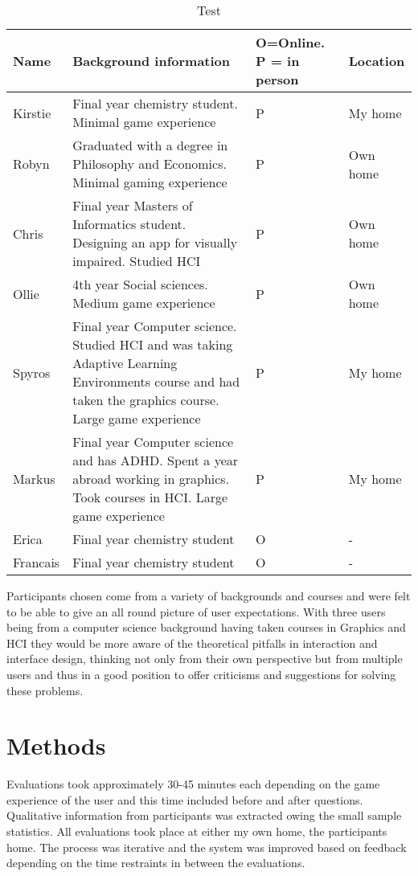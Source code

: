 \begin{table}[H]
    \begin{tabular}{| p{2cm} | p{9cm} | p{3cm} | p{3cm} |}
    \hline
    Name & Background information & O=Online. P = in person & Location \\
    \hline
    \hline
    Kirstie & Final year chemistry student. Minimal game experience & P & My home\\ \hline
    Robyn & Graduated with a degree in Philosophy and Economics. Minimal gaming experience & P & Own home \\ \hline
    Chris & Final year Masters of Informatics student. Designing an app for visually impaired. Studied HCI & P & Own home \\ \hline
    Ollie & 4th year Social sciences. Medium game experience & P & Own home \\ \hline
    Spyros & Final year Computer science. Studied HCI and was taking Adaptive Learning Environments course and had taken the graphics course. Large game experience & P & My home \\ \hline
    Markus & Final year Computer science and has ADHD. Spent a year abroad working in graphics. Took courses in HCI. Large game experience & P & My home \\ \hline
    Erica & Final year chemistry student & O & -\\ \hline
    Francais & Final year chemistry student & O & - \\ \hline
    \end{tabular}
    \caption{Test}
\end{table}

Participants chosen come from a variety of backgrounds and courses and were felt to be able to give an all round picture of user expectations. With three users being from a computer science background having taken courses in Graphics and HCI they would be more aware of the theoretical pitfalls in interaction and interface design, thinking not only from their own perspective but from multiple users and thus in a good position to offer criticisms and suggestions for solving these problems.

\section{Methods}

Evaluations took approximately 30-45 minutes each depending on the game experience of the user and this time included before and after questions. Qualitative information from participants was extracted owing the small sample statistics. All evaluations took place at either my own home, the participants home. The process was iterative and the system was improved based on feedback depending on the time restraints in between the evaluations.  

